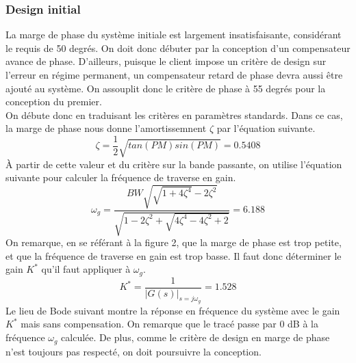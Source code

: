\documentclass{udes_rapport} %
\begin{document}
\subsubsection{Design initial}
La marge de phase du système initiale est largement insatisfaisante, considérant le requis de 50 degrés. On doit donc débuter par la conception d'un compensateur avance de phase. D'ailleurs, puisque le client impose un critère de design sur l'erreur en régime permanent, un compensateur retard de phase devra aussi être ajouté au système. On assouplit donc le critère de phase à 55 degrés pour la conception du premier.\\
On débute donc en traduisant les critères en paramètres standards. Dans ce cas, la marge de phase nous donne l'amortissemnent $\zeta$ par l'équation suivante.
\[ \zeta =  \frac{1}{2}\sqrt{tan(PM)sin(PM)} = 0.5408\]
À partir de cette valeur et du critère sur la bande passante, on utilise l'équation suivante pour calculer la fréquence de traverse en gain.
\[ \omega_g =  \frac{BW\sqrt{\sqrt{1+4\zeta^4}-2\zeta^2}}{\sqrt{1-2\zeta^2+\sqrt{4\zeta^4-4\zeta^2+2}}} = 6.188\]
On remarque, en se référant à la figure 2, que la marge de phase est trop petite, et que la fréquence de traverse en gain est trop basse. Il faut donc déterminer le gain $K^*$ qu'il faut appliquer à $\omega_g$.
\[K^* = \frac{1}{|G(s)|_{s=j\omega_g}} = 1.528\]
Le lieu de Bode suivant montre la réponse en fréquence du système avec le gain $K^*$ mais sans compensation. On remarque que le tracé passe par 0 dB à la fréquence $\omega_g$ calculée. De plus, comme le critère de design en marge de phase n'est toujours pas respecté, on doit poursuivre la conception.

\end{document}
